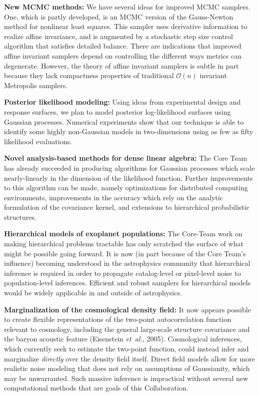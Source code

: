 \documentclass[11pt]{article}
\newcommand{\foreign}[1]{\textsl{#1}}
\newcommand{\etal}{\foreign{et~al.}}
\begin{document}
\textbf{New MCMC methods:}
We have several ideas for improved MCMC samplers.
One, which is partly developed, is an MCMC version of the Gauss-Newton
method for nonlinear least squares.
This sampler uses derivative information to realize affine invariance,
and is augmented by a stochastic step size control algorithm that satisfies
detailed balance.
There are indications that improved affine invariant samplers depend on 
controlling the different ways metrics can degenerate.
However, the theory of affine invariant samplers is subtle in part
because they
lack compactness properties of traditional $\mathcal O(n)$ invariant 
Metropolis
samplers.

\textbf{Posterior likelihood modeling:}
Using ideas from experimental design and response surfaces, we plan to
model posterior log-likelihood surfaces using
Gaussian processes.
Numerical experiments show that our technique is able to
identify some highly non-Gaussian models in two-dimensions using 
as few as
fifty likelihood evaluations.

\textbf{Novel analysis-based methods for dense linear algebra:}
The Core Team has already succeeded in producing algorithms for Gaussian
processes which scale nearly-linearly in the dimension of the likelihood
function.
Further improvements to this algorithm can be made, namely optimizations
for distributed computing environments, improvements in the accuracy
which rely on the analytic formulation of the covariance kernel, and
extensions to hierarchical probabilistic structures.

\textbf{Hierarchical models of exoplanet populations:}
The Core-Team work on making hierarchical problems tractable has
only scratched the surface of what might be possible going forward.
It is now (in part because of the Core Team's influence) becoming
understood in the astrophysics community that hierarchical inference
is required in order to propagate catalog-level or pixel-level noise to
population-level inferences.
Efficient and robust samplers for hierarchical models would be widely 
applicable in
and outside of astrophysics.

\textbf{Marginalization of the cosmological density field:} 
It now appears possible to create flexible representations of the
two-point autocorrelation function relevant to cosmology, including
the general large-scale structure covariance and the baryon
acoustic feature (Eisenstein \etal, 2005).
Cosmological inferences, which currently seek to estimate the two-point 
function, could instead infer and marginalize {\em directly}
over the density field itself.
Direct field models allow for more realistic noise modeling that does
not rely
on assumptions of Gaussianity, which may be unwarranted.
Such massive inference is impractical without several new computational
methods
that are goals of this Collaboration.
\end{document}
